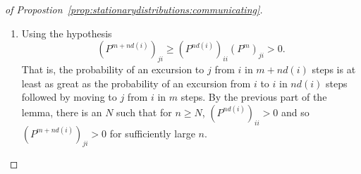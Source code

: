 \documentclass[12pt]{article}
\begin{document}
\begin{proof}[of Propostion~\ref{prop:stationarydistributions:communicating}]
\begin{enumerate}
\begin{enumerate}
                    > 0 \).
                \item
                    Let \( n_j = m_{ij} + m_{ji} \).  Then
                    \[
                        (P^{n_j})_{ii} = (P^{m_{ij} + m_{ji}})_{ii} \ge
                        (P^{m_{ij}})_{ij } (P^{m_{ji}})_{ji} > 0.
                    \] That is, the probability of a return to \( i \)
                    from \( i \) in \( n_j \) steps is at least as great
                    as the probability of an excursion from \( i \) to \(
                    j \) in \( m_{ij} \) steps with return to \( i \)
                    from \( j \) in \( m_{ji} \) steps.
                \item
                    Using the Markov property of independence of the
                    past and the future given the present state,
                    \( (P^{n_j})_{ii} > 0 \) implies
                    that for any positive integer \( c_j \), \( (P^{c_j
                    n_j})_ {ii} > 0 \), that is, the probability of \( c_j
                    \) sequential returns is still positive.
                \item
                    By the number theoretic Lemma~%
                    \ref{lem:stationarydistributions:numtheory}, there
                    exists \( N \) and positive integers \( c_1, \dots,
                    c_k \) such that if \( n \ge N \)
                    \[
                        (P^{n d(i)})_{ii} = (P^{c_1 n_1 + \cdots + c_k n_k})_
                        {ii} \ge (P^{c_1 n_1})_{ii} \cdot \dots \cdot (P^
                        {c_k n_k})_{ii} >0.
                    \]
            \end{enumerate}
          \item
            Using the hypothesis
            \[
                (P^{m + n d(i)})_{ji} \ge (P^{n d(i)})_{ii} (P^m)_{ji}
                > 0.
            \] That is, the probability of an excursion to \( j \) from \(
            i \) in \( m + n d(i) \) steps is at least as great as the
            probability of an excursion from \( i \) to \( i \) in \( n
            d(i) \) steps followed by moving to \( j \) from \( i \) in \(
            m \) steps.  By the previous part of the lemma, there is an \(
            N \) such that for \( n \ge N \), \( (P^{n d(i)})_{ii} > 0 \)
            and so \( (P^{m + n d(i)})_{ji} >0 \) for sufficiently large
            \( n \).
    \end{enumerate}
\end{proof}
\end{document}
